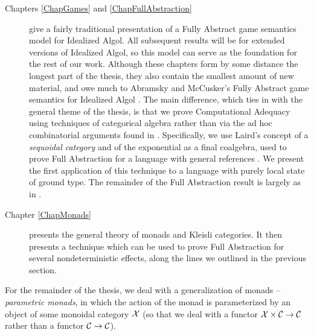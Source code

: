 \documentclass[11pt]{report}
\begin{document}
\begin{description}
  \item[Chapters \ref{ChapGames} and \ref{ChapFullAbstraction}] give a fairly traditional presentation of a Fully Abstract game semantics model for Idealized Algol.  
    All subsequent results will be for extended versions of Idealized Algol, so this model can serve as the foundation for the rest of our work.  
    Although these chapters form by some distance the longest part of the thesis, they also contain the smallest amount of new material, and owe much to Abramsky and McCusker's Fully Abstract game semantics for Idealized Algol \cite{SamsonGuyIAActive}.  
    The main difference, which ties in with the general theme of the thesis, is that we prove Computational Adequacy using techniques of categorical algebra rather than via the ad hoc combinatorial arguments found in \cite{SamsonGuyIAActive}.  
    Specifically, we use Laird's concept of a \emph{sequoidal category} and of the exponential as a final coalgebra, used to prove Full Abstraction for a language with general references \cite{laird02}.  
    We present the first application of this technique to a language with purely local state of ground type.
    The remainder of the Full Abstraction result is largely as in \cite{SamsonGuyIAActive}.
  \item[Chapter \ref{ChapMonads}] presents the general theory of monads and Kleisli categories.  
    It then presents a technique which can be used to prove Full Abstraction for several nondeterministic effects, along the lines we outlined in the previous section.
\end{description}
For the remainder of the thesis, we deal with a generalization of monads -- \emph{parametric monads}, in which the action of the monad is parameterized by an object of some monoidal category $\mathcal X$ (so that we deal with a functor $\mathcal X \times {\mathcal{C}} \to {\mathcal{C}}$ rather than a functor ${\mathcal{C}} \to {\mathcal{C}}$).
\end{document}
